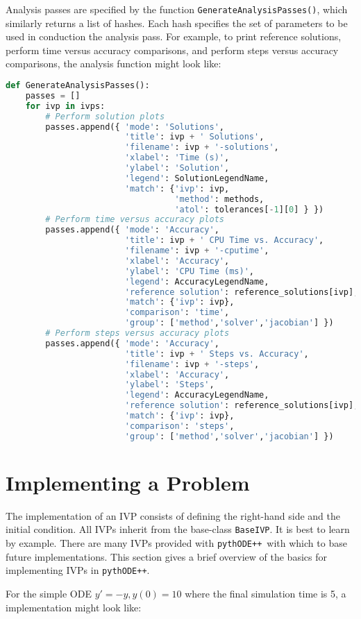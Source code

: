 \documentclass[11pt]{article}
\newcommand{\pypp}{\texttt{pythODE++}}
\begin{document}
Analysis passes are specified by the function \verb=GenerateAnalysisPasses()=, which similarly returns a list of hashes. Each hash specifies the set of parameters to be used in conduction the analysis pass. For example, to print reference solutions, perform time versus accuracy comparisons, and perform steps versus accuracy comparisons, the analysis function might look like:
\begin{lstlisting}[tabsize=4,language=Python]
def GenerateAnalysisPasses():
	passes = []
	for ivp in ivps:
		# Perform solution plots
		passes.append({ 'mode': 'Solutions',
						'title': ivp + ' Solutions',
						'filename': ivp + '-solutions',
						'xlabel': 'Time (s)',
						'ylabel': 'Solution',
						'legend': SolutionLegendName,
						'match': {'ivp': ivp,
								  'method': methods,
								  'atol': tolerances[-1][0] } })
		# Perform time versus accuracy plots
		passes.append({ 'mode': 'Accuracy',
						'title': ivp + ' CPU Time vs. Accuracy',
						'filename': ivp + '-cputime',
						'xlabel': 'Accuracy',
						'ylabel': 'CPU Time (ms)',
						'legend': AccuracyLegendName,
						'reference solution': reference_solutions[ivp],
						'match': {'ivp': ivp},
						'comparison': 'time',
						'group': ['method','solver','jacobian'] })
		# Perform steps versus accuracy plots
		passes.append({ 'mode': 'Accuracy',
						'title': ivp + ' Steps vs. Accuracy',
						'filename': ivp + '-steps',
						'xlabel': 'Accuracy',
						'ylabel': 'Steps',
						'legend': AccuracyLegendName,
						'reference solution': reference_solutions[ivp],
						'match': {'ivp': ivp},
						'comparison': 'steps',
						'group': ['method','solver','jacobian'] })
\end{lstlisting}


\section{Implementing a Problem}

The implementation of an IVP consists of defining the right-hand side and the initial condition. All IVPs inherit from the base-class \verb=BaseIVP=. It is best to learn by example. There are many IVPs provided with \pypp\ with which to base future implementations. This section gives a brief overview of the basics for implementing IVPs in \pypp.

For the simple ODE $y'=-y, y(0)=10$ where the final simulation time is 5, a implementation might look like:
\end{document}
